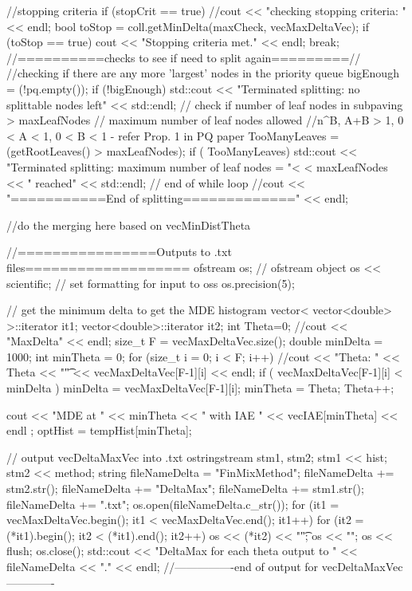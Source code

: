 \begin{DoxyCode}
{{{        //stopping criteria
        if (stopCrit == true) {
          //cout << "checking stopping criteria: " << endl;
          bool toStop = coll.getMinDelta(maxCheck, vecMaxDeltaVec);
          if (toStop == true) {
            cout << "Stopping criteria met." << endl;
            break;
          } 
        }
        //==========checks to see if need to split again=========//
            //checking if there are any more 'largest' nodes in the priority
       queue
            bigEnough = (!pq.empty());
            if (!bigEnough){    
          std::cout << "Terminated splitting: no splittable nodes left"
                    << std::endl;
            }
        // check if number of leaf nodes in subpaving > maxLeafNodes
        // maximum number of leaf nodes allowed
        //n^B, A+B > 1, 0  < A < 1, 0 < B < 1 - refer Prop. 1 in PQ paper
        TooManyLeaves = (getRootLeaves() > maxLeafNodes);
        if ( TooManyLeaves) {
          std::cout << "Terminated splitting: maximum number of leaf nodes = "<
      < maxLeafNodes << " reached"
                          << std::endl;
        }
      } // end of while loop
      //cout << "===========End of splitting=============" << endl;
        
      //do the merging here based on vecMinDistTheta
         
      //================Outputs to .txt files=================== 
      ofstream os;         // ofstream object
      os << scientific;  // set formatting for input to oss
      os.precision(5);

       // get the minimum delta to get the MDE histogram
      vector< vector<double> >::iterator it1; 
      vector<double>::iterator it2;
      int Theta=0;
      //cout << "MaxDelta" << endl;
      size_t F = vecMaxDeltaVec.size(); 
      double minDelta = 1000;
      int minTheta = 0;
      for (size_t i = 0; i < F; i++){
        //cout << "Theta: " << Theta << "\t" << vecMaxDeltaVec[F-1][i] << endl;
        if ( vecMaxDeltaVec[F-1][i] < minDelta ) { 
          minDelta = vecMaxDeltaVec[F-1][i]; 
          minTheta = Theta; 
        } 
        Theta++;
      }

      cout << "MDE at " << minTheta << " with IAE " << vecIAE[minTheta] << endl
      ; 
         optHist = tempHist[minTheta];

      // output vecDeltaMaxVec into .txt 
      ostringstream stm1, stm2;
      stm1 << hist;
      stm2 << method;
      string fileNameDelta = "FinMixMethod";
      fileNameDelta += stm2.str();
      fileNameDelta += "DeltaMax";
      fileNameDelta += stm1.str();
      fileNameDelta += ".txt";  
      os.open(fileNameDelta.c_str());
      for (it1 = vecMaxDeltaVec.begin(); it1 < vecMaxDeltaVec.end(); it1++){ 
        for (it2 = (*it1).begin(); it2 < (*it1).end(); it2++){
          os << (*it2) << "\t";
        }
        os << "\n";
      }          
      os << flush;
      os.close();
      std::cout << "DeltaMax for each theta output to " << fileNameDelta << "."
       << endl;
      //----------------end of output for vecDeltaMaxVec-------------
 
}}
\end{DoxyCode}
